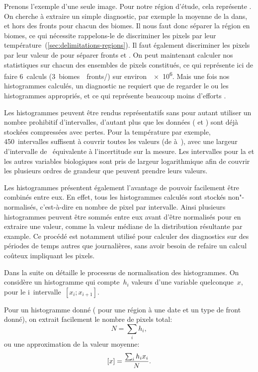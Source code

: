 Prenons l'exemple d'une seule image. Pour notre région d'étude, cela représente .
On cherche à extraire un simple diagnostic, par exemple la moyenne de la  dans, et hors des fronts pour chacun des biomes.
Il nous faut donc séparer la région en biomes, ce qui nécessite rappelons-le de discriminer les pixels par leur température~(\cref{sec:delimitations-regions}).
Il faut également discriminer les pixels par leur valeur de  pour séparer fronts et .
On peut maintenant calculer nos statistiques sur chacun des ensembles de pixels constitués, ce qui représente ici de faire 6~calculs (3~biomes~\texttimes\ fronts/) sur environ~\qty{e6}{\pixels}.
Mais une fois nos histogrammes calculés, un diagnostic ne requiert que de regarder le ou les histogrammes appropriés, et ce qui représente beaucoup moins d'efforts .

Les histogrammes peuvent être rendus représentatifs sans pour autant utiliser un nombre prohibitif d'intervalles, d'autant plus que les données ( et ) sont déjà stockées compressées avec pertes. Pour la température par exemple, 450~intervalles suffisent à couvrir toutes les valeurs (de  à~), avec une largeur d'intervalle de~ équivalente à l'incertitude sur la mesure.
Les intervalles pour la  et les autres variables biologiques sont pris de largeur logarithmique afin de couvrir les plusieurs ordres de grandeur que peuvent prendre leurs valeurs.

Les histogrammes présentent également l'avantage de pouvoir facilement être combinés entre eux.
En effet, tous les histogrammes calculés sont stockés non"-normalisés, c'est-à-dire en nombre de pixel par intervalle. Ainsi plusieurs histogrammes peuvent être sommés entre eux avant d'être normalisés pour en extraire une valeur, comme la valeur médiane de la distribution résultante par example.
Ce procédé est notamment utilisé pour calculer des diagnostics sur des périodes de temps autres que journalières, sans avoir besoin de refaire un calcul coûteux impliquant les pixels.

Dans la suite on détaille le processus de normalisation des histogrammes.
On considère un histogramme qui compte~\(h_i\) valeurs d'une variable quelconque~\(x\), pour le i\ieme{}~intervalle~\(\left[x_i; x_{i+1} \right]\).

Pour un histogramme donné ( pour une région à une date et un type de front donné), on extrait facilement le nombre de pixels total:
\begin{equation}
  N = \sum_i h_i,
\end{equation}
ou une approximation de la valeur moyenne:
\begin{equation}
  \left[x\right] = \frac{\sum_i h_i x_i} {N}.
\end{equation}

